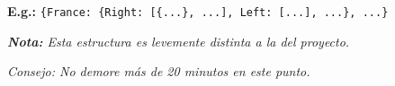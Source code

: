 {\textbf{E.g.:} \texttt{\{\textquotedbl France\textquotedbl: \{\textquotedbl Right\textquotedbl: [\{...\}, ...], \textquotedbl Left\textquotedbl: [...], ...\}, ...\}}

\textit{\textbf{Nota:} Esta estructura es levemente distinta a la del proyecto.}

\textit{Consejo: No demore más de 20 minutos en este punto.}
}

\newpage

\vspace*{1.5cm}

\programmingGrid
